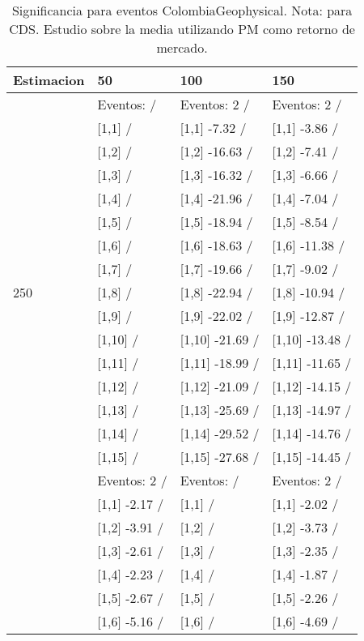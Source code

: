\begin{table}

\caption{Significancia para eventos ColombiaGeophysical. Nota: para CDS. Estudio sobre la media utilizando PM como retorno de mercado.}
\centering
\begin{tabular}[t]{llll}
\toprule
Estimacion & 50 & 100 & 150\\
\midrule
 & Eventos:   / & Eventos:  2 / & Eventos:  2 /\\
 & {}[1,1]  / & {}[1,1] -7.32  / & {}[1,1] -3.86  /\\
 & {}[1,2]  / & {}[1,2] -16.63  / & {}[1,2] -7.41  /\\
 & {}[1,3]  / & {}[1,3] -16.32  / & {}[1,3] -6.66  /\\
 & {}[1,4]  / & {}[1,4] -21.96  / & {}[1,4] -7.04  /\\
\addlinespace
 & {}[1,5]  / & {}[1,5] -18.94  / & {}[1,5] -8.54  /\\
 & {}[1,6]  / & {}[1,6] -18.63  / & {}[1,6] -11.38  /\\
 & {}[1,7]  / & {}[1,7] -19.66  / & {}[1,7] -9.02  /\\
250 & {}[1,8]  / & {}[1,8] -22.94  / & {}[1,8] -10.94  /\\
 & {}[1,9]  / & {}[1,9] -22.02  / & {}[1,9] -12.87  /\\
\addlinespace
 & {}[1,10]  / & {}[1,10] -21.69  / & {}[1,10] -13.48  /\\
 & {}[1,11]  / & {}[1,11] -18.99  / & {}[1,11] -11.65  /\\
 & {}[1,12]  / & {}[1,12] -21.09  / & {}[1,12] -14.15  /\\
 & {}[1,13]  / & {}[1,13] -25.69  / & {}[1,13] -14.97  /\\
 & {}[1,14]  / & {}[1,14] -29.52  / & {}[1,14] -14.76  /\\
\addlinespace
 & {}[1,15]  / & {}[1,15] -27.68  / & {}[1,15] -14.45  /\\
 & Eventos:  2 / & Eventos:   / & Eventos:  2 /\\
 & {}[1,1] -2.17  / & {}[1,1]  / & {}[1,1] -2.02  /\\
 & {}[1,2] -3.91  / & {}[1,2]  / & {}[1,2] -3.73  /\\
 & {}[1,3] -2.61  / & {}[1,3]  / & {}[1,3] -2.35  /\\
\addlinespace
 & {}[1,4] -2.23  / & {}[1,4]  / & {}[1,4] -1.87  /\\
 & {}[1,5] -2.67  / & {}[1,5]  / & {}[1,5] -2.26  /\\
 & {}[1,6] -5.16  / & {}[1,6]  / & {}[1,6] -4.69  /\\

\end{tabular}
\end{table}
